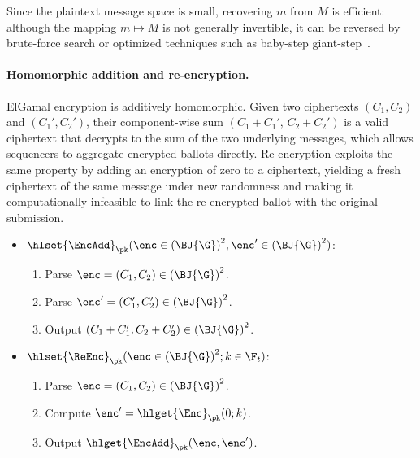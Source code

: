 Since the plaintext message space is small, recovering $m$ from $M$ is efficient: although the mapping $m \mapsto M$ is not generally invertible, it can be reversed by brute-force search or optimized techniques such as baby-step giant-step~\cite{blake1995elliptic}.

\paragraph{Homomorphic addition and re-encryption.} ElGamal encryption is additively homomorphic. Given two ciphertexts $(C_1, C_2)$ and $(C_1', C_2')$, their component-wise sum $(C_1 + C_1',\, C_2 + C_2')$ is a valid ciphertext that decrypts to the sum of the two underlying messages, which allows sequencers to aggregate encrypted ballots directly. Re-encryption exploits the same property by adding an encryption of zero to a ciphertext, yielding a fresh ciphertext of the same message under new randomness and making it computationally infeasible to link the re-encrypted ballot with the original submission.

\begin{mdframed}
	\begin{minipage}[t]{0.53\textwidth}
		\begin{itemize}
			\item[$\bullet$] $\hlset{\EncAdd}_{\pk}(\enc \in {(\BJ{\G})}^2, \enc' \in {(\BJ{\G})}^2)$:
			\begin{enumerate}
				\item Parse $\enc = (C_1, C_2) \in {(\BJ{\G})}^2$.
				\item Parse $\enc' = (C_1', C_2') \in {(\BJ{\G})}^2$.
				\item Output $(C_1 + C_1', C_2 + C_2') \in {(\BJ{\G})}^2$.
			\end{enumerate}
		\end{itemize}
	\end{minipage}
	\begin{minipage}[t]{0.45\textwidth}
		\begin{itemize}
			\item[$\bullet$] $\hlset{\ReEnc}_{\pk}(\enc \in {(\BJ{\G})}^2; k\in\F_t)$: \vspace{0.1cm}
			\begin{enumerate}
				\item Parse $\enc = (C_1, C_2) \in {(\BJ{\G})}^2$.
				\item Compute $\enc' = \hlget{\Enc}_{\pk}(0; k)$.
				\item Output $\hlget{\EncAdd}_{\pk}(\enc, \enc')$.
			\end{enumerate}
		\end{itemize}
	\end{minipage}
\end{mdframed}

